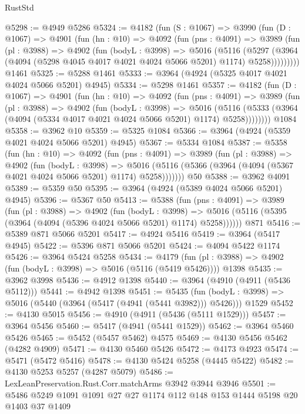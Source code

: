 \begin{lexlean}{RustStd}
\begin{coremodule}
{\begin{coremodule}
{{{{{{{{{{{{{{{{{{{{{{{{{{{{{{{{{{{{{{@5298 := @4949 @5286
@5324 := @4182
    (fun (S : @1067) =>
    @3990
      (fun (D : @1067) =>
      @4901
        (fun (hn : @10) =>
        @4092
          (fun (pns : @4091) =>
          @3989
            (fun (pl : @3988) =>
            @4902
              (fun (bodyL : @3998) =>
              @5016
                (@5116
                  (@5297
                    (@3964 (@4094 (@5298 @4045 @4017 @4021 @4024 @5066 @5201) @1174) @5258)))))))))
    @1461
@5325 := @5288 @1461
@5333 := @3964 (@4924 (@5325 @4017 @4021 @4024 @5066 @5201) @4945)
@5334 := @5298 @1461
@5357 := @4182
    (fun (D : @1067) =>
    @4901
      (fun (hn : @10) =>
      @4092
        (fun (pns : @4091) =>
        @3989
          (fun (pl : @3988) =>
          @4902
            (fun (bodyL : @3998) =>
            @5016
              (@5116 (@5333 (@3964 (@4094 (@5334 @4017 @4021 @4024 @5066 @5201) @1174) @5258))))))))
    @1084
@5358 := @3962 @10
@5359 := @5325 @1084
@5366 := @3964 (@4924 (@5359 @4021 @4024 @5066 @5201) @4945)
@5367 := @5334 @1084
@5387 := @5358
    (fun (hn : @10) =>
    @4092
      (fun (pns : @4091) =>
      @3989
        (fun (pl : @3988) =>
        @4902
          (fun (bodyL : @3998) =>
          @5016 (@5116 (@5366 (@3964 (@4094 (@5367 @4021 @4024 @5066 @5201) @1174) @5258)))))))
    @50
@5388 := @3962 @4091
@5389 := @5359 @50
@5395 := @3964 (@4924 (@5389 @4024 @5066 @5201) @4945)
@5396 := @5367 @50
@5413 := @5388
    (fun (pns : @4091) =>
    @3989
      (fun (pl : @3988) =>
      @4902
        (fun (bodyL : @3998) =>
        @5016 (@5116 (@5395 (@3964 (@4094 (@5396 @4024 @5066 @5201) @1174) @5258))))))
    @871
@5416 := @5389 @871 @5066 @5201
@5417 := @4924 @5416
@5419 := @3964 (@5417 @4945)
@5422 := @5396 @871 @5066 @5201
@5424 := @4094 @5422 @1174
@5426 := @3964 @5424 @5258
@5434 := @4179
    (fun (pl : @3988) => @4902 (fun (bodyL : @3998) => @5016 (@5116 (@5419 @5426))))
    @1398
@5435 := @3962 @3998
@5436 := @4912 @1398
@5440 := @3964 (@4910 (@4911 (@5436 @5112)))
@5441 := @4942 @1398
@5451 := @5435
    (fun (bodyL : @3998) => @5016 (@5440 (@3964 (@5417 (@4941 (@5441 @3982))) @5426)))
    @1529
@5452 := @4130 @5015
@5456 := @4910 (@4911 (@5436 (@5111 @1529)))
@5457 := @3964 @5456
@5460 := @5417 (@4941 (@5441 @1529))
@5462 := @3964 @5460 @5426
@5465 := @5452 (@5457 @5462) @4575
@5469 := @4130 @5456 @5462 (@4282 @4909)
@5471 := @4130 @5460 @5426
@5472 := @4173 @4923
@5474 := @5471 (@5472 @5416)
@5478 := @4130 @5424 @5258 (@4445 @5422)
@5482 := @4130 @5253 @5257 (@4287 @5079)
@5486 := LexLeanPreservation.Rust.Corr.matchArms @3942 @3944 @3946
@5501 := @5486 @5249 @1091 @1091 @27 @27 @1174 @112 @148 @153 @1444 @5198 @20 @1403 @37 @1409
}}}}}}}}}}}}}}}}}}}}}}}}}}}}}}}}}}}}}}
\end{coremodule}}
\end{coremodule}
\end{lexlean}
